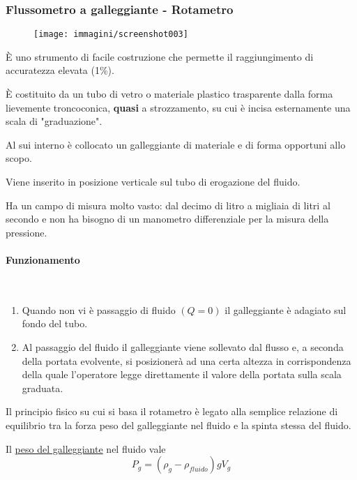 \documentclass[a4paper, 15pt]{article}
\begin{document}
\subsubsection{Flussometro a galleggiante - Rotametro}
\begin{adjustwidth}{2in}{}	
	\begin{figure}[H]
		\centering
		\texttt{[image: immagini/screenshot003]}
		\label{fig:screenshot003}
	\end{figure}
	È uno strumento di facile costruzione che permette il
	raggiungimento di accuratezza elevata (1\%).
	
	È costituito da un tubo di vetro o materiale plastico trasparente dalla forma lievemente troncoconica, \textbf{quasi} a strozzamento, su cui è incisa esternamente una scala di "graduazione". 
	
	Al sui interno è collocato un galleggiante di materiale e di forma opportuni allo scopo.
	
	Viene inserito in posizione verticale sul tubo di erogazione del fluido.
	
	Ha un campo di misura molto vasto: dal decimo di litro
	a migliaia di litri al secondo e non ha bisogno di un manometro differenziale per la
	misura della pressione.  
	
	\paragraph{Funzionamento} \mbox{} \\
	\begin{enumerate}
		\item Quando non vi è passaggio di fluido $(Q=0)$ il galleggiante è
		adagiato sul fondo del tubo.
		
		\item Al passaggio del fluido il galleggiante viene
		sollevato dal flusso e, a seconda della portata evolvente, si posizionerà ad
		una certa altezza in corrispondenza della quale l’operatore legge
		direttamente il valore della portata sulla scala graduata.
	\end{enumerate}
	
	Il principio fisico su cui si basa il rotametro è legato alla semplice relazione di equilibrio tra la forza peso del galleggiante nel fluido e la spinta stessa del fluido.\newline 
	
	Il \underline{peso del galleggiante} nel fluido vale
	\[P_g = (\rho_g-\rho_{fluido}) g V_g\]
	

\end{adjustwidth}
\end{document}
